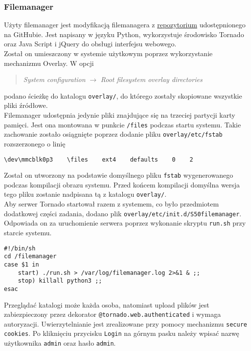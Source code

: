 \documentclass[10pt,a4paper]{article}
\begin{document}
\subsubsection{Filemanager}
Użyty filemanager jest modyfikacją filemanagera z \href{https://github.com/CyRaXMAN/filemanager}{repozytorium} udostępnionego na GitHubie. Jest napisany w języku Python, wykorzystuje środowisko Tornado oraz Java Script i jQuery do obsługi interfejsu webowego.\\[\baselineskip]
Został on umieszczony w systemie użytkowym poprzez wykorzystanie mechanizmu Overlay. W opcji
\begin{quote}
\textit{System configuration} $\rightarrow$ \textit{Root filesystem overlay directories}
\end{quote}
podano ścieżkę do katalogu \texttt{overlay/}, do którego zostały skopiowane wszystkie pliki źródłowe.\\[\baselineskip]
Filemanager udostępnia jedynie pliki znajdujące się na trzeciej partycji karty pamięci. Jest ona montowana w punkcie \texttt{/files} podczas startu systemu. Takie zachowanie zostało osiągnięte poprzez dodanie pliku \texttt{overlay/etc/fstab} rozszerzonego o linię
\begin{lstlisting}[style=bash]
\dev\mmcblk0p3    \files    ext4    defaults    0    2
\end{lstlisting}
Został on utworzony na podstawie domyślnego pliku \texttt{fstab} wygenerowanego podczas kompilacji obrazu systemu. Przed końcem kompilacji domyślna wersja tego pliku zostanie nadpisana tą z katalogu \texttt{overlay/}.\\[\baselineskip]
Aby serwer Tornado startował razem z systemem, co było przedmiotem dodatkowej części zadania, dodano plik \texttt{overlay/etc/init.d/S50filemanager}. Odpowiada on za uruchomienie serwera poprzez wykonanie skryptu \texttt{run.sh} przy starcie systemu.
\begin{lstlisting}[style=bash, caption={Zawartość pliku S50filemanager}]
#!/bin/sh
cd /filemanager
case $1 in
    start) ./run.sh > /var/log/filemanager.log 2>&1 & ;;
    stop) killall python3 ;;
esac
\end{lstlisting}
Przeglądać katalogi może każda osoba, natomiast upload plików jest zabiezpieczony przez dekorator \texttt{@tornado.web.authenticated} i wymaga autoryzacji. Uwierzytelnianie jest zrealizowane przy pomocy mechanizmu \texttt{secure cookies}. Po kliknięciu przycisku \texttt{Login} na górnym pasku należy wpisać nazwę użytkownika \texttt{admin} oraz hasło \texttt{admin}.
\end{document}
